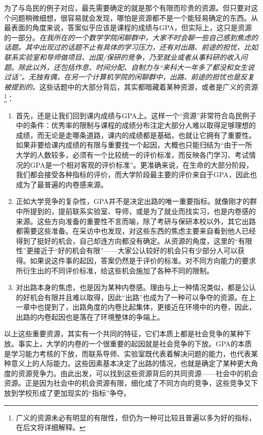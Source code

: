 \documentclass[UTF8,a4paper,fontset=windows,11pt,openany]{ctexbook}
\begin{document}
为了与岛民的例子对应，最先需要确定的就是那个有限而珍贵的资源。但只要对这个问题稍微细想，很容易就会发现，哪怕是资源都不是一个能轻易确定的东西。从最表面的角度来说，答案似乎应该是课程的成绩与GPA，但实际上，这只是资源的一部分。\emph{在我所在的一个数学学院闲聊群中，大家不时会聊一些自己感到焦虑的话题。其中出现过的话题不止有具体的学习压力，还有对出路、前途的担忧，比如联系实验室和导师做项目、出国/保研的竞争，乃至就业或者从事科研的收入问题。除此以外，还包括作息、时间分配、自制力与“来科大一年多了都没和女生说过话”。无独有偶，在另一个计算机学院的闲聊群中，出路、前途的担忧也是反复被提到的。}这些话题中的大部分背后，其实都暗藏着某种资源，或者是广义的资源\footnote{广义的资源未必有明显的有限性，但仍为一种可比较且普遍以多为好的指标，在后文将详细解释。}：
\begin{enumerate}
    \item 首先，还是让我们回到课内成绩与GPA上。这样一个“资源”非常符合岛民例子中的条件：优秀率的限制与课程的成绩分布注定大部分人难以取得足够理想的成绩，而无论是走哪条道路，课内的成绩都是基础，也就让它拥有了重要性。如果非要给课内成绩的有限与重要找一个起因，大概也只能归结为“由于一所大学的人数较多，必须有一个比较统一的评价标准，而反映各门学习、考试情况的GPA是一个相对客观的评价标准”。更准确来说，在生命的大部分阶段，我们都会接受各种指标的评价，而大学阶段最主要的评价来自于GPA，因此也成为了最普遍的内卷感来源。
    \item 正如大学竞争的复杂性，GPA并不是决定出路的唯一重要指标。就像刚才的群中所提到的，提前联系实验室、导师，或是为了就业而找实习，也是内卷感的来源。这些方向准备的重要性不言而喻，除了考研与保研本校以外，其它出路都需要这些准备。在采访中也发现，对这些东西的焦虑主要来自看到他人已经得到了挺好的机会，自己却连方向都没有确定。从资源的角度，这里的“有限性”更接近于“好的机会有限”——大家公认较好的机会只有少部分人可以获得。如果说这件事的起因，答案仍然是于评价的标准。对不同方向能力的要求所衍生出的不同评价标准，给这些机会施加了各种不同的限制。
    \item 对出路本身的焦虑，也是因为某种内卷感。理由与上一种情况类似，都是公认的好机会有限并且难以取得，因此“出路”也成为了一种可以争夺的资源。在上一章中也提到了，出路角度的内卷比起集体，更接近在环境中的内卷，因此，出路的内卷起因也是落在了环境整体的争端上。
\end{enumerate}

以上这些重要资源，其实有一个共同的特征，它们本质上都是社会竞争的某种下放。事实上，大学的内卷的一个很重要的起因就是社会竞争的下放。GPA的本质是学习能力考核的下放，而联系导师、实验室既代表着解决问题的能力，也代表某种意义上的人际能力。这些因素基本决定了出路的情况，也就是确定了某种更大角度的资源竞争力。由此出发，可以找到这些资源背后的共同资源——社会中的机会资源。正是因为社会中的机会资源有限，细化成了不同方向的竞争，这些竞争又下放到学校形成了更加现实的“指标”争夺。
\end{document}
